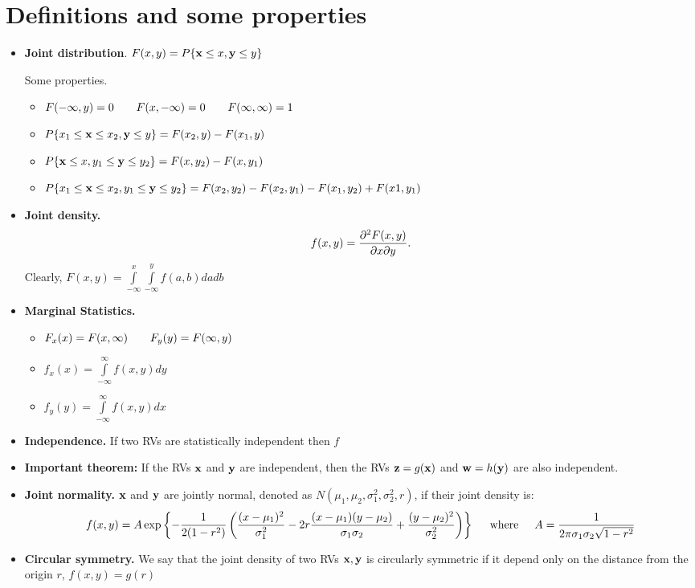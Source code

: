 \documentclass[a4paper, oneside]{book}
\begin{document}
\section{Definitions and some properties}

\begin{itemize}
\item \textbf{Joint distribution}. $F(x,y) = P\{\mathbf x \le x, \mathbf y \le y\}$

Some properties.
	\begin{itemize}
	\item $F(-\infty,y) = 0 \hspace{0.7truecm} F(x,-\infty)=0 \hspace{0.7truecm} F(\infty, \infty)=1$
	\item $P\{x_1 \le \mathbf x \le x_2, \mathbf y \le y\} = F(x_2,y) - F(x_1, y)$
	\item $P\{\mathbf x \le x, y_1 \le \mathbf y \le y_2\} = F(x,y_2) - F(x, y_1)$
	\item $P\{x_1 \le \mathbf x \le x_2, y_1 \le \mathbf y \le y_2\} = F(x_2, y_2) - F(x_2, y_1) - F(x_1, y_2) + F(x1, y_1)$
	\end{itemize}

\item \textbf{Joint density.} $$f(x,y) = \frac{\partial^2 F(x,y)}{\partial x \partial y}.$$ Clearly, $F(x,y) = \int\limits_{-\infty}^x \int\limits_{-\infty}^y f(a,b)dadb$

\item \textbf{Marginal Statistics.}
	\begin{itemize}
	\item $F_x(x) = F(x,\infty) \hspace{0.7truecm} F_y(y) = F(\infty, y)$
	\item $f_x(x) = \int\limits_{-\infty}^{\infty} f(x,y) dy$
	\item $f_y(y) = \int\limits_{-\infty}^{\infty} f(x,y) dx$
	\end{itemize}
\item \textbf{Independence.} If two RVs are statistically independent then $f$
\item \textbf{Important theorem:} If the RVs $\mathbf x$ and $\mathbf y$ are independent, then the RVs $\mathbf z = g(\mathbf x)$ and $\mathbf w = h(\mathbf y)$ are also independent. 
\item \textbf{Joint normality. } $\mathbf x$ and $\mathbf y$ are jointly normal, denoted as $N(\mu_1, \mu_2, \sigma_1^2, \sigma_2^2, r)$,  if their joint density is:
$$f(x,y) =  A \exp\left\{ -\frac{1}{2(1-r^2)} \left( \frac{(x-\mu_1)^2}{\sigma_1^2} -2 r\frac{(x-\mu_1)(y-\mu_2)}{\sigma_1 \sigma_2} + \frac{(y-\mu_2)^2}{\sigma_2^2}  \right)  \right\}\hspace{0.5cm}\text{where}\hspace{0.5cm}A= \frac{1}{2\pi \sigma_1 \sigma_2 \sqrt{1-r^2}}$$
\item \textbf{Circular symmetry. } We say that the joint density of two RVs $\mathbf{x,y}$ is circularly symmetric if it depend only on the distance from the origin $r$, \ie $f(x,y) = g(r)$
\end{itemize}
\end{document}
